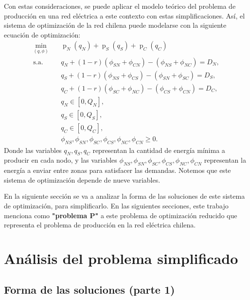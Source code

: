 \documentclass[12pt,twoside]{article}
\begin{document}
	\hspace{1cm} Con estas consideraciones, se puede aplicar el modelo te\'orico del problema de producci\'on en una red el\'ectrica a este contexto con estas simplificaciones. As\'i, el sistema de optimizaci\'on de la red chilena puede modelarse con la siguiente ecuaci\'on de optimizaci\'on:
	\begin{equation*}\begin{aligned}
				\min_{(q,\phi)} \quad & \operatorname{p}_N(q_N)+\operatorname{p}_S(q_S)+\operatorname{p}_C(q_C) \\
				\textrm{s.a.} \quad & q_N+(1-r)(\phi_{SN}+\phi_{CN})-(\phi_{NS}+\phi_{NC})=D_N, \\
				\quad & q_S+(1-r)(\phi_{NS}+\phi_{CS})-(\phi_{SN}+\phi_{SC})=D_S, \\
				\quad & q_C+(1-r)(\phi_{SC}+\phi_{NC})-(\phi_{CS}+\phi_{CN})=D_C, \\
				& q_N\in[0,Q_N], \\
				& q_S\in[0,Q_S], \\
				& q_C\in[0,Q_C], \\
				& \phi_{NS},\phi_{SN},\phi_{SC},\phi_{CS},\phi_{NC},\phi_{CN}\geq0.
		\end{aligned}\end{equation*}
	\hspace{1cm} Donde las variables \(q_N,q_S,q_C\) representan la cantidad de energ\'ia m\'inima a producir en cada nodo, y las variables \(\phi_{NS},\phi_{SN},\phi_{SC},\phi_{CS},\phi_{NC},\phi_{CN}\) representan la energ\'ia a enviar entre zonas para satisfacer las demandas. Notemos que este sistema de optimizaci\'on depende de nueve variables.
	
	\hspace{1cm} En la siguiente secci\'on se va a analizar la forma de las soluciones de este sistema de optimizaci\'on, para simplificarlo. En las siguientes secciones, este trabajo menciona como \textbf{"problema P"} a este problema de optimizaci\'on reducido que representa el problema de producci\'on en la red el\'ectrica chilena.
	\newpage
	
	\section{An\'alisis del problema simplificado}
	\subsection{Forma de las soluciones (parte 1)}
	
\end{document}

